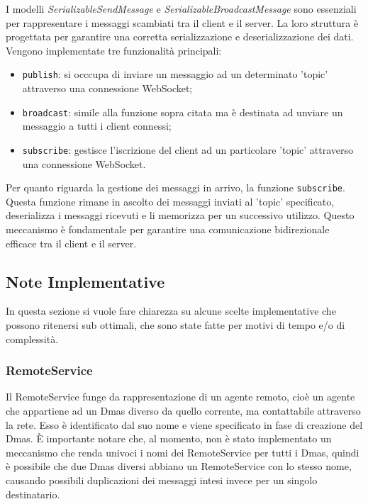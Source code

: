 I modelli \textit{SerializableSendMessage} e \textit{SerializableBroadcastMessage} sono essenziali per rappresentare i messaggi scambiati tra il client e
il server. La loro struttura è progettata per garantire una corretta serializzazione e deserializzazione dei dati. \\

Vengono implementate tre funzionalità principali:
\begin{itemize}
    \item \texttt{publish}: si occcupa di inviare un messaggio ad un determinato 'topic' attraverso una connessione WebSocket;
    \item \texttt{broadcast}: simile alla funzione sopra citata ma è destinata ad unviare un messaggio a tutti i client connessi;
    \item \texttt{subscribe}: gestisce l'iscrizione del client ad un particolare 'topic' attraverso una connessione WebSocket.
\end{itemize}

Per quanto riguarda la gestione dei messaggi in arrivo, la funzione \texttt{subscribe}.
Questa funzione rimane in ascolto dei messaggi inviati al 'topic' specificato, deserializza i messaggi ricevuti e li memorizza per un successivo utilizzo.
Questo meccanismo è fondamentale per garantire una comunicazione bidirezionale efficace tra il client e il server.

\subsection{Note Implementative}
In questa sezione si vuole fare chiarezza su alcune scelte implementative che possono ritenersi sub ottimali, che sono state fatte per motivi di tempo e/o di complessità.

\subsubsection{RemoteService}
Il RemoteService funge da rappresentazione di un agente remoto, cioè un agente che appartiene ad un Dmas diverso da quello corrente, ma contattabile attraverso la rete.
Esso è identificato dal suo nome e viene specificato in fase di creazione del Dmas. È importante notare che, al momento, non è stato implementato un meccanismo che renda
univoci i nomi dei RemoteService per tutti i Dmas, quindi è possibile che due Dmas diversi abbiano un RemoteService con lo stesso nome, causando possibili duplicazioni dei
messaggi intesi invece per un singolo destinatario.\\

